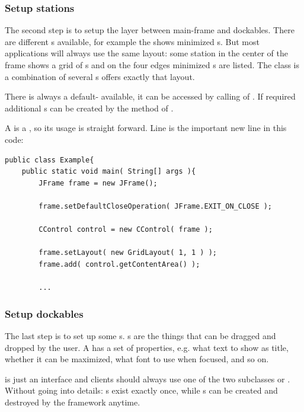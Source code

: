 \subsubsection{Setup stations}
The second step is to setup the layer between main-frame and dockables. There are different s available, for example the  shows minimized s. But most applications will always use the same layout: some station in the center of the frame shows a grid of s and on the four edges minimized s are listed. The class  is a combination of several s offers exactly that layout.

There is always a default- available, it can be accessed by calling  of . If required additional s can be created by the method  of .

A  is a , so its usage is straight forward. Line  is the important new line in this code:
\begin{lstlisting}
public class Example{
	public static void main( String[] args ){
		JFrame frame = new JFrame();
		
		frame.setDefaultCloseOperation( JFrame.EXIT_ON_CLOSE );
		
		CControl control = new CControl( frame );
		
		frame.setLayout( new GridLayout( 1, 1 ) );
		frame.add( control.getContentArea() );
		
		...
\end{lstlisting}


\subsubsection{Setup dockables}
The last step is to set up some s. s are the things that can be dragged and dropped by the user. A  has a set of properties, e.g. what text to show as title, whether it can be maximized, what font to use when focused, and so on.

 is just an interface and clients should always use one of the two subclasses  or . Without going into details: s exist exactly once, while s can be created and destroyed by the framework anytime.

